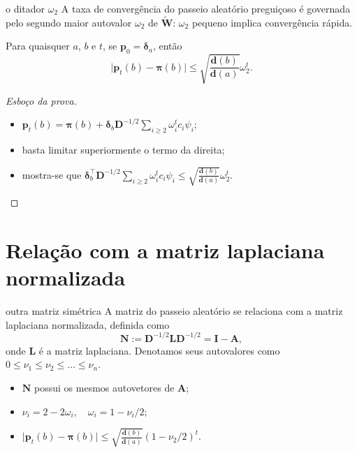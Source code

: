 \documentclass{beamer}
\begin{document}
\begin{frame}{o ditador \(\omega_2\)}
    A taxa de convergência do passeio aleatório preguiçoso é governada pelo \alert{segundo maior autovalor} \(\omega_2\) de \(\widetilde{\mathbf{W}}\): \(\omega_2\) pequeno implica convergência rápida.

    \begin{thm}
        Para quaisquer \(a\), \(b\) e \(t\), se \(\mathbf{p}_0 = \mathbf{\delta}_a\), então
        \begin{equation*}
            \vert \mathbf{p}_t(b) - \mathbf{\pi}(b) \vert \leq \sqrt{\frac{\mathbf{d}(b)}{\mathbf{d}(a)}} \omega_2^t.
        \end{equation*}
    \end{thm} \pause
    \begin{proof}[Esboço da prova]
        \begin{itemize}
            \item \(\mathbf{p}_t(b) = \mathbf{\pi}(b) + \mathbf{\delta}_b\mathbf{D}^{-1/2}\sum_{i \geq 2} \omega_i^t c_i \psi_i\);
            \item basta limitar superiormente o termo da direita;
            \item mostra-se que \(\mathbf{\delta}_b^\intercal\mathbf{D}^{-1/2}\sum_{i \geq 2} \omega_i^t c_i \psi_i \leq \sqrt{\frac{\mathbf{d}(b)}{\mathbf{d}(a)}} \omega_2^t\).
        \end{itemize}
    \end{proof}
\end{frame}

\section{Relação com a matriz laplaciana normalizada}

\begin{frame}{outra matriz simétrica}
    A matriz do passeio aleatório se relaciona com a \alert{matriz laplaciana normalizada}, definida como
    \begin{equation*}
        \mathbf{N} := \mathbf{D}^{-1/2} \mathbf{L} \mathbf{D}^{-1/2} = \mathbf{I} - \mathbf{A},
    \end{equation*} onde \(\mathbf{L}\) é a matriz laplaciana. Denotamos seus autovalores como \(0 \leq \nu_1 \leq \nu_2 \leq \ldots \leq \nu_n\). \pause
    \begin{itemize}
        \item \(\mathbf{N}\) possui os mesmos autovetores de \(\mathbf{A}\);
        \item \(\nu_i = 2 - 2\omega_i, \quad \omega_i = 1 - \nu_i/2\);
        \item \(\vert \mathbf{p}_t(b) - \mathbf{\pi}(b) \vert \leq \sqrt{\frac{\mathbf{d}(b)}{\mathbf{d}(a)}} (1 - \nu_2/2)^t\).
    \end{itemize}
\end{frame}
\end{document}
